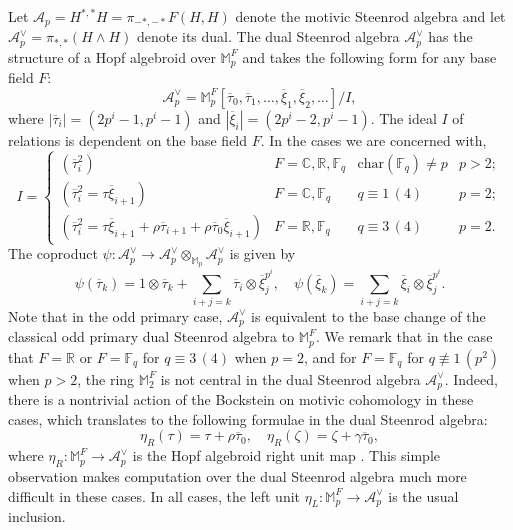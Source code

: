 \documentclass{amsart}
\theoremstyle{plain}
\numberwithin{theorem}{section}
\numberwithin{equation}{section}
\numberwithin{figure}{section}
\newcommand{\cA}{{\mathcal A}}
\newcommand{\0}{\langle 0 \rangle }
\begin{document}

Let $\cA_p = H^{*,*} H = \pi_{-*,-*} F(H,H)$ denote the motivic Steenrod algebra and let $\cA^\vee_p= \pi_{*,*}(H \wedge H)$ denote its dual. The dual Steenrod algebra $\mathcal{A}_p^\vee$ has the structure of a Hopf algebroid over $\mathbb{M}_p^F$ \cite{Voereduced} and takes the following form for any base field $F$: 
\[
\cA^\vee_p = \mathbb{M}_p^F [\overline{\tau}_0, \overline{\tau}_1, \dots, \overline{\xi}_1, \overline{\xi}_2, \dots] /I,
\]
where $|\overline{\tau}_i| = (2p^i-1, p^i-1)$ and $|\overline{\xi}_i| = (2p^i-2, p^i-1).$ The ideal $I$ of relations is dependent on the base field $F$. In the cases we are concerned with, 
\begin{equation} \label{eq:SteenrodRelIdeal}
    I = \left\{\begin{array}{llrr}
    (\overline{\tau}_i^2) & F=\mathbb{C},\mathbb{R},\mathbb{F}_q&\text{char}(\mathbb{F}_q)\neq p & p>2;\\
    (\overline{\tau}_i^2 = \tau\overline{\xi}_{i+1}) & F = \mathbb{C}, \mathbb{F}_q \, & q \equiv 1 \, (4) &p=2;\\
    (\overline{\tau}_i^2 = \tau\overline{\xi}_{i+1} + \rho \overline{\tau}_{i+1} + \rho \overline{\tau}_0\overline{\xi}_{i+1}) & F = \mathbb{R}, \mathbb{F}_q \, & q \equiv 3 \, (4)&p=2.
\end{array}\right.
\end{equation}
The coproduct $\psi:\mathcal{A}^\vee_p \to \mathcal{A}^\vee_p \otimes_{\mathbb{M}_p}\mathcal{A}^\vee_p$ is given by
\[\psi(\overline{\tau}_k) = 1 \otimes \overline{\tau}_k + \sum_{i+j=k}\overline{\tau}_i \otimes \overline{\xi}_j^{p^i}, \quad \psi(\overline{\xi}_k) = \sum_{i+j=k}\overline{\xi}_i \otimes \overline{\xi}_j^{p^i}.\]
Note that in the odd primary case, $\mathcal{A}^\vee_p$ is equivalent to the base change of the classical odd primary dual Steenrod algebra to $\mathbb{M}_p^F$. 
We remark that in the case that $F = \mathbb{R}$ or $F=\mathbb{F}_q$ for $q \equiv 3 \, (4)$ when $p=2$, and for $F=\mathbb{F}_q$ for $q \not\equiv 1 \, (p^2)$ when $p>2$, the ring $\mathbb{M}_2^F$ is not central in the dual Steenrod algebra $\mathcal{A}_p^\vee$. Indeed, there is a nontrivial action of the Bockstein on motivic cohomology in these cases, which translates to the following formulae in the dual Steenrod algebra:
\[\eta_R(\tau) = \tau + \rho\overline{\tau}_0, \quad \eta_R(\zeta) = \zeta + \gamma\overline{\tau}_0,\]
where $\eta_R:\mathbb{M}_p^F \to \mathcal{A}_p^\vee$ is the Hopf algebroid right unit map \cite{HoyKelOst17,Voemotiviccohomology}. This simple observation makes computation over the dual Steenrod algebra much more difficult in these cases. In all cases, the left unit $\eta_L:\mathbb{M}_p^F \to \mathcal{A}^\vee_p$ is the usual inclusion.
\end{document}
